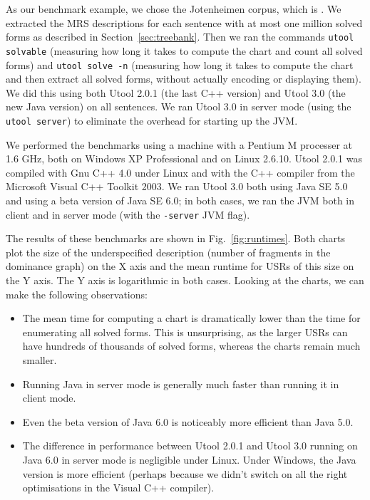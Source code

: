 As our benchmark example, we chose the Jotenheimen corpus, which is
. We extracted the MRS
descriptions for each sentence with at most one million solved forms
as described in Section~\ref{sec:treebank}. Then we ran the commands
\verb?utool solvable? (measuring how long it takes to compute the
chart and count all solved forms) and \verb?utool solve -n? (measuring
how long it takes to compute the chart and then extract all solved
forms, without actually encoding or displaying them). We did this
using both Utool 2.0.1 (the last C++ version) and Utool 3.0 (the new
Java version) on all sentences. We ran Utool 3.0 in server mode (using
the \verb?utool server?) to eliminate the overhead for starting up the
JVM.

We performed the benchmarks using a machine with a Pentium M processer
at 1.6 GHz, both on Windows XP Professional and on Linux 2.6.10. Utool
2.0.1 was compiled with Gnu C++ 4.0 under Linux and with the C++
compiler from the Microsoft Visual C++ Toolkit 2003. We ran Utool 3.0
both using Java SE 5.0 and using a beta version of Java SE 6.0; in
both cases, we ran the JVM both in client and in server mode (with the
\verb?-server? JVM flag).

The results of these benchmarks are shown in
Fig.~\ref{fig:runtimes}. Both charts plot the size of the
underspecified description (number of fragments in the dominance
graph) on the X axis and the mean runtime for USRs of this size on the
Y axis. The Y axis is logarithmic in both cases. Looking at the
charts, we can make the following observations:
\begin{itemize}
\item The mean time for computing a chart is dramatically lower than
the time for enumerating all solved forms. This is unsurprising, as
the larger USRs can have hundreds of thousands of solved forms,
whereas the charts remain much smaller.
\item Running Java in server mode is generally much faster than
running it in client mode.
\item Even the beta version of Java 6.0 is noticeably more efficient
than Java 5.0.
\item The difference in performance between Utool 2.0.1 and Utool 3.0
running on Java 6.0 in server mode is negligible under Linux. Under
Windows, the Java version is more efficient (perhaps because we didn't
switch on all the right optimisations in the Visual C++ compiler).
\end{itemize}










